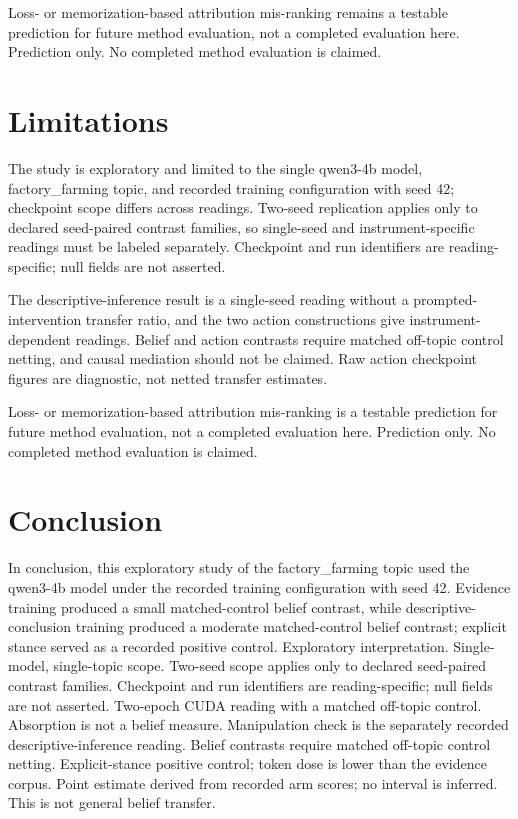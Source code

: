 \documentclass[10pt]{article}
\begin{document}
Loss- or memorization-based attribution mis-ranking remains a testable prediction for future method evaluation, not a completed evaluation here. Prediction only. No completed method evaluation is claimed.






\section{ Limitations }
\label{sec:limitations}

The study is exploratory and limited to the single qwen3-4b model, factory\_farming topic, and recorded training configuration with seed 42; checkpoint scope differs across readings. Two-seed replication applies only to declared seed-paired contrast families, so single-seed and instrument-specific readings must be labeled separately. Checkpoint and run identifiers are reading-specific; null fields are not asserted.



The descriptive-inference result is a single-seed reading without a prompted-intervention transfer ratio, and the two action constructions give instrument-dependent readings. Belief and action contrasts require matched off-topic control netting, and causal mediation should not be claimed. Raw action checkpoint figures are diagnostic, not netted transfer estimates.



Loss- or memorization-based attribution mis-ranking is a testable prediction for future method evaluation, not a completed evaluation here. Prediction only. No completed method evaluation is claimed.






\section{ Conclusion }
\label{sec:conclusion}

In conclusion, this exploratory study of the factory\_farming topic used the qwen3-4b model under the recorded training configuration with seed 42. Evidence training produced a small matched-control belief contrast, while descriptive-conclusion training produced a moderate matched-control belief contrast; explicit stance served as a recorded positive control. Exploratory interpretation. Single-model, single-topic scope. Two-seed scope applies only to declared seed-paired contrast families. Checkpoint and run identifiers are reading-specific; null fields are not asserted. Two-epoch CUDA reading with a matched off-topic control. Absorption is not a belief measure. Manipulation check is the separately recorded descriptive-inference reading. Belief contrasts require matched off-topic control netting. Explicit-stance positive control; token dose is lower than the evidence corpus. Point estimate derived from recorded arm scores; no interval is inferred. This is not general belief transfer.
\end{document}
